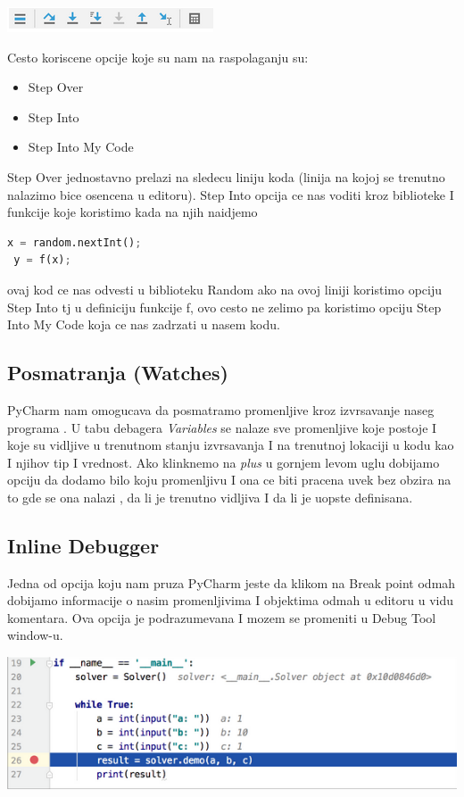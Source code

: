 \documentclass[a4paper]{article}
\begin{document}
\includegraphics[scale = 0.6]{2}

Cesto koriscene opcije koje su nam na raspolaganju su:
\begin{itemize}
\item  Step Over
\item  Step Into
\item Step Into My Code
\end{itemize}
Step Over jednostavno prelazi na sledecu liniju koda (linija na kojoj se trenutno nalazimo bice osencena u editoru). Step Into opcija ce nas voditi kroz biblioteke I funkcije koje koristimo kada na njih naidjemo
\begin{lstlisting}[language = Python, caption={Primer neki}]
 x = random.nextInt();
 y = f(x);
\end{lstlisting} 
 ovaj kod ce nas odvesti u biblioteku Random ako na ovoj liniji koristimo opciju Step Into tj u definiciju funkcije f, ovo cesto ne zelimo pa koristimo opciju Step Into My Code koja ce nas zadrzati u nasem kodu. 
\subsection{Posmatranja (Watches)}
PyCharm nam omogucava da posmatramo promenljive kroz izvrsavanje naseg programa . U tabu debagera \emph{Variables} se nalaze sve promenljive koje postoje I koje su vidljive u trenutnom stanju izvrsavanja I na trenutnoj lokaciji u kodu  kao I njihov tip I vrednost. Ako klinknemo na \emph {plus} u gornjem levom uglu dobijamo opciju da dodamo bilo koju promenljivu I ona ce biti pracena uvek bez obzira na to gde se ona nalazi , da li je trenutno vidljiva I da li je uopste definisana.
\subsection{Inline Debugger}
Jedna od opcija koju nam pruza PyCharm jeste da klikom na Break point odmah dobijamo informacije o nasim promenljivima I objektima odmah u editoru u vidu komentara. Ova opcija je podrazumevana I mozem se promeniti u Debug Tool window-u.


\includegraphics[scale = 0.4]{3}
\end{document}
